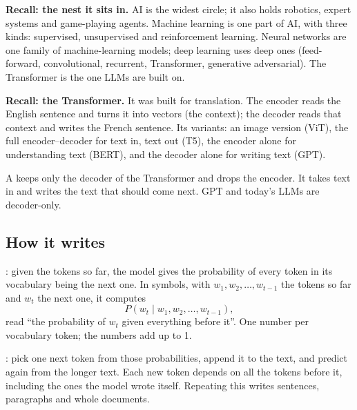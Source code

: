 \begin{recall}
\textbf{Recall: the nest it sits in.} AI is the widest circle; it also holds robotics, expert systems and game-playing agents. Machine learning is one part of AI, with three kinds: supervised, unsupervised and reinforcement learning. Neural networks are one family of machine-learning models; deep learning uses deep ones (feed-forward, convolutional, recurrent, Transformer, generative adversarial). The Transformer is the one LLMs are built on.
\end{recall}

\begin{recall}
\textbf{Recall: the Transformer.} It was built for translation. The encoder reads the English sentence and turns it into vectors (the context); the decoder reads that context and writes the French sentence. Its variants: an image version (ViT), the full encoder--decoder for text in, text out (T5), the encoder alone for understanding text (BERT), and the decoder alone for writing text (GPT).
\end{recall}

\begin{definition}
A  keeps only the decoder of the Transformer and drops the encoder. It takes text in and writes the text that should come next. GPT and today's LLMs are decoder-only.
\end{definition}

\subsection*{How it writes}

\begin{definition}
: given the tokens so far, the model gives the probability of every token in its vocabulary being the next one. In symbols, with $w_1, w_2, \dots, w_{t-1}$ the tokens so far and $w_t$ the next one, it computes
\[
P(w_t \mid w_1, w_2, \dots, w_{t-1}),
\]
read ``the probability of $w_t$ given everything before it''. One number per vocabulary token; the numbers add up to 1.
\end{definition}

\begin{definition}
: pick one next token from those probabilities, append it to the text, and predict again from the longer text. Each new token depends on all the tokens before it, including the ones the model wrote itself. Repeating this writes sentences, paragraphs and whole documents.
\end{definition}

